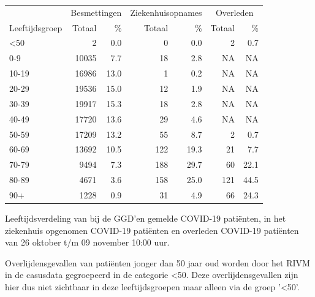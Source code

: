 \documentclass[
  english,
  man,floatsintext]{apa6}
\begin{document}
\begin{table}
\centering\begingroup\fontsize{11}{13}\selectfont

\begin{threeparttable}
\begin{tabular}{lrrrrrr}
\toprule
\multicolumn{1}{c}{ } & \multicolumn{2}{c}{Besmettingen} & \multicolumn{2}{c}{Ziekenhuisopnames} & \multicolumn{2}{c}{Overleden} \\
\cmidrule(l{3pt}r{3pt}){2-3} \cmidrule(l{3pt}r{3pt}){4-5} \cmidrule(l{3pt}r{3pt}){6-7}
Leeftijdsgroep & Totaal & \% & Totaal & \% & Totaal & \%\\
\midrule
<50 & 2 & 0.0 & 0 & 0.0 & 2 & 0.7\\
0-9 & 10035 & 7.7 & 18 & 2.8 & NA & NA\\
10-19 & 16986 & 13.0 & 1 & 0.2 & NA & NA\\
20-29 & 19536 & 15.0 & 12 & 1.9 & NA & NA\\
30-39 & 19917 & 15.3 & 18 & 2.8 & NA & NA\\
40-49 & 17720 & 13.6 & 29 & 4.6 & NA & NA\\
50-59 & 17209 & 13.2 & 55 & 8.7 & 2 & 0.7\\
60-69 & 13692 & 10.5 & 122 & 19.3 & 21 & 7.7\\
70-79 & 9494 & 7.3 & 188 & 29.7 & 60 & 22.1\\
80-89 & 4671 & 3.6 & 158 & 25.0 & 121 & 44.5\\
90+ & 1228 & 0.9 & 31 & 4.9 & 66 & 24.3\\
\bottomrule
\end{tabular}
\begin{tablenotes}
\item[1] Leeftijdsverdeling van bij de GGD’en gemelde COVID-19 patiënten, in het ziekenhuis opgenomen COVID-19 patiënten en overleden COVID-19 patiënten van 26 oktober t/m 09 november 10:00 uur.
\item[2] Overlijdensgevallen van patiënten jonger dan 50 jaar oud worden door het RIVM in de casusdata gegroepeerd in de categorie <50. Deze overlijdensgevallen zijn hier dus niet zichtbaar in deze leeftijdsgroepen maar alleen via de groep '<50'.
\end{tablenotes}
\end{threeparttable}
\endgroup{}
\end{table}

\newpage
\end{document}
